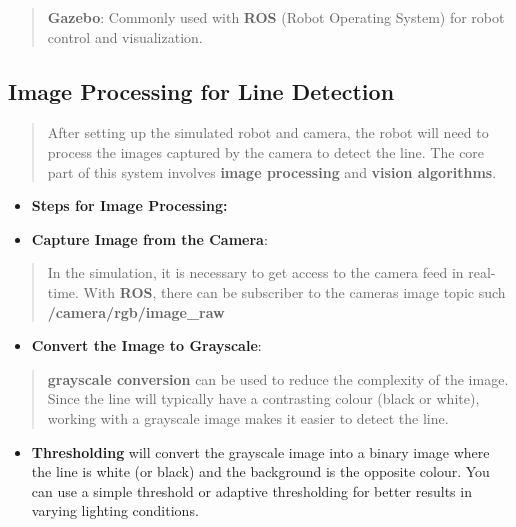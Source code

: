 \documentclass[../../main]{subfiles}
\begin{document}
    \begin{quote}
    \textbf{Gazebo}: Commonly used with \textbf{ROS} (Robot Operating
    System) for robot control and visualization.
    \end{quote}
    
    
      \subsection*{Image Processing for Line Detection}
    
    
    \begin{quote}
    After setting up the simulated robot and camera, the robot will need to
    process the images captured by the camera to detect the line. The core
    part of this system involves \textbf{image processing} and
    \textbf{vision algorithms}.
    \end{quote}
    
    \begin{itemize}
    \item
      \textbf{Steps for Image Processing:}
    \end{itemize}
    
    \begin{itemize}
    \item
      \textbf{Capture Image from the Camera}:
    \end{itemize}
    
    \begin{quote}
    In the simulation, it is necessary to get access to the camera feed in
    real-time. With \textbf{ROS}, there can be subscriber to the
    camera\textquotesingle s image topic such
    \textbf{/camera/rgb/image\_raw}
    \end{quote}
    
    \begin{itemize}
    \item
      \textbf{Convert the Image to Grayscale}:
    \end{itemize}
    
    \begin{quote}
    \textbf{grayscale conversion} can be used to reduce the complexity of
    the image. Since the line will typically have a contrasting colour
    (black or white), working with a grayscale image makes it easier to
    detect the line.
    \end{quote}
    
    \begin{itemize}
    \item
      \textbf{Thresholding} will convert the grayscale image into a binary
      image where the line is white (or black) and the background is the
      opposite colour. You can use a simple threshold or adaptive
      thresholding for better results in varying lighting conditions.
    \end{itemize}
    
\end{document}
